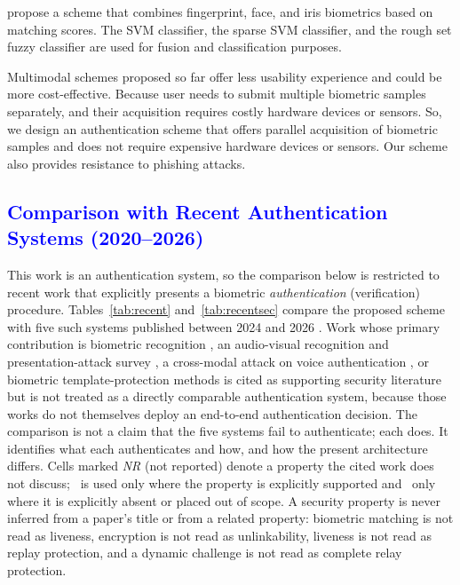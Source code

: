 \documentclass[10pt,journal,compsoc]{IEEEtran}
\newcommand{\xmark}{\ding{55}}
\begin{document}
\cite{r3} propose a  scheme that combines fingerprint, face, and iris biometrics based on matching scores. The SVM classifier, the sparse SVM classifier, and the rough set fuzzy classifier are used for fusion and classification purposes.

 

Multimodal schemes proposed so far offer less usability experience and could be more cost-effective. Because user needs to submit multiple biometric samples separately, and their acquisition requires costly hardware devices or sensors. So, we design an authentication scheme that offers parallel acquisition of biometric samples and does not require expensive hardware devices or sensors. Our scheme also provides resistance to phishing attacks.

{\color{blue}
\subsection{\textcolor{blue}{Comparison with Recent Authentication Systems (2020--2026)}}\label{sec:recent}
This work is an authentication system, so the comparison below is restricted to recent work that explicitly presents a biometric \emph{authentication} (verification) procedure. Tables~\ref{tab:recent} and~\ref{tab:recentsec} compare the proposed scheme with five such systems published between 2024 and 2026 \cite{jha2024featurefusion,aanjankumar2025smartcity,jha2025ensemble,chen2026twostep,jha2025challenge}. Work whose primary contribution is biometric recognition \cite{alharbi2023facevoice}, an audio-visual recognition and presentation-attack survey \cite{mandalapu2021avpad}, a cross-modal attack on voice authentication \cite{jiang2024foice}, or biometric template-protection methods \cite{rathgeb2023btp,zhao2023deephash} is cited as supporting security literature but is not treated as a directly comparable authentication system, because those works do not themselves deploy an end-to-end authentication decision. The comparison is not a claim that the five systems fail to authenticate; each does. It identifies what each authenticates and how, and how the present architecture differs. Cells marked \emph{NR} (not reported) denote a property the cited work does not discuss; \checkmark\ is used only where the property is explicitly supported and \xmark\ only where it is explicitly absent or placed out of scope. A security property is never inferred from a paper's title or from a related property: biometric matching is not read as liveness, encryption is not read as unlinkability, liveness is not read as replay protection, and a dynamic challenge is not read as complete relay protection.

}
\end{document}
